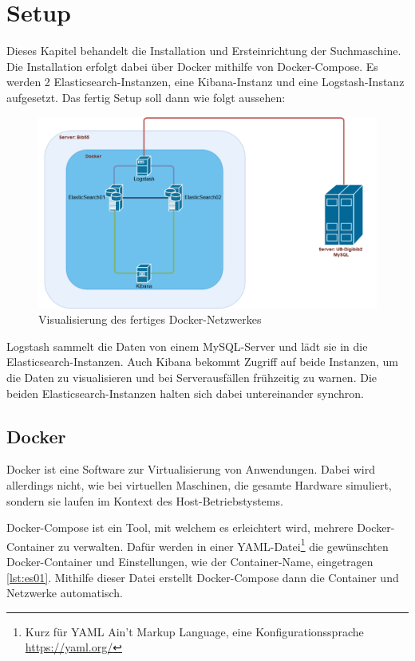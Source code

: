 \chapter{Setup}

Dieses Kapitel behandelt die Installation und Ersteinrichtung der Suchmaschine. Die Installation erfolgt dabei über Docker mithilfe von Docker-Compose. Es werden 2 Elasticsearch-Instanzen, eine Kibana-Instanz und eine Logstash-Instanz aufgesetzt. Das fertig Setup soll dann wie folgt aussehen:

\begin{figure}
	\centering
	\includegraphics[width=1\linewidth]{images/docker_structure.png}
	\caption{Visualisierung des fertiges Docker-Netzwerkes}
	\label{img:dockerNetwork}
\end{figure}

Logstash sammelt die Daten von einem MySQL-Server und lädt sie in die Elasticsearch-Instanzen. Auch Kibana bekommt Zugriff auf beide Instanzen, um die Daten zu visualisieren und bei Serverausfällen frühzeitig zu warnen. Die beiden Elasticsearch-Instanzen halten sich dabei untereinander synchron. 

\section{Docker}

Docker ist eine Software zur Virtualisierung von Anwendungen. Dabei wird allerdings nicht, wie bei virtuellen Maschinen, die gesamte Hardware simuliert, sondern sie laufen im Kontext des Host-Betriebstystems.

Docker-Compose ist ein Tool, mit welchem es erleichtert wird, mehrere Docker-Container zu verwalten. Dafür werden in einer YAML-Datei\footnote{Kurz für YAML Ain't Markup Language, eine Konfigurationssprache \url{https://yaml.org/}} die gewünschten Docker-Container und Einstellungen, wie der Container-Name, eingetragen \ref{lst:es01}. Mithilfe dieser Datei erstellt Docker-Compose dann die Container und Netzwerke automatisch.

